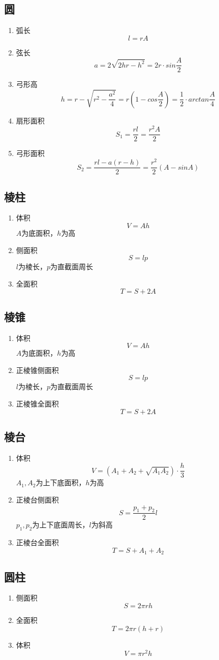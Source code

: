 \subsection{圆}
	\begin{enumerate}
		\item 弧长
			$$l=rA$$
		\item 弦长
			$$a=2\sqrt{2hr-h^2}=2r\cdot sin\frac{A}{2}$$
		\item 弓形高
			$$h=r-\sqrt{r^2-\frac{a^2}{4}}=r(1-cos\frac{A}{2})=\frac{1}{2} \cdot arctan\frac{A}{4}$$
		\item 扇形面积
			$$S_1=\frac{rl}{2}=\frac{r^2A}{2}$$
		\item 弓形面积
			$$S_2=\frac{rl-a(r-h)}{2}=\frac{r^2}{2}(A-sinA)$$
	\end{enumerate}
\subsection{棱柱}
	\begin{enumerate}
		\item 体积
			$$V=Ah$$
			$A$为底面积，$h$为高
		\item 侧面积
			$$S=lp$$
			$l$为棱长，$p$为直截面周长
		\item 全面积
			$$T=S+2A$$
	\end{enumerate}
\subsection{棱锥}
	\begin{enumerate}
		\item 体积
			$$V=Ah$$
			$A$为底面积，$h$为高
		\item 正棱锥侧面积
			$$S=lp$$
			$l$为棱长，$p$为直截面周长
		\item 正棱锥全面积
			$$T=S+2A$$
	\end{enumerate}
\subsection{棱台}
	\begin{enumerate}
		\item 体积
			$$V=(A_1+A_2+\sqrt{A_1A_2}) \cdot \frac{h}{3}$$
			$A_1,A_2$为上下底面积，$h$为高
		\item 正棱台侧面积
			$$S=\frac{p_1+p_2}{2}l$$
			$p_1,p_2$为上下底面周长，$l$为斜高
		\item 正棱台全面积
			$$T=S+A_1+A_2$$
	\end{enumerate}
\subsection{圆柱}
	\begin{enumerate}
		\item 侧面积
			$$S=2\pi rh$$
		\item 全面积
			$$T=2\pi r(h+r)$$
		\item 体积
			$$V=\pi r^2h$$
	\end{enumerate}
